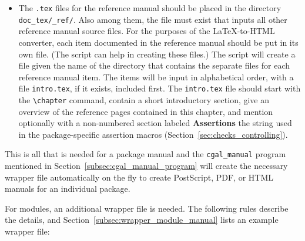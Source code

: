 \begin{itemize}
   \item The {\tt .tex} files for the reference manual should be placed in the 
         directory \verb|doc_tex/|\verb|_ref/|.
         Also among them, the file 
          must exist that inputs all other reference
         manual source files.
         For the purposes of the \LaTeX -to-HTML converter, each item 
         documented in the reference manual should be put in its own file. 
         (The script  can help
          in creating these files.)
         The script  
         will create a 
         file given the name of the directory that contains the separate files 
         for each
         reference manual item.  The items will be input in alphabetical order,
         with a file {\tt intro.tex}, if it 
         exists, included first.  The
         {{\tt intro.tex}} file should start with the \verb|\chapter| command,
         contain a short introductory section, give an overview of the
         reference pages contained in this chapter, and mention
         optionally with a non-numbered section labeled \textbf{Assertions} 
         the string used in the package-specific assertion macros 
         (Section~\ref{sec:checks_controlling}). 
\end{itemize}

This is all that is needed for a package manual and the
\texttt{cgal\_manual} program mentioned in
Section~\ref{subsec:cgal_manual_program} will create the necessary
wrapper file automatically on the fly to create PostScript, PDF, or
HTML manuals for an individual package.

For modules, an additional wrapper file is needed. The following rules
describe the details, and Section~\ref{subsec:wrapper_module_manual}
lists an example wrapper file:

